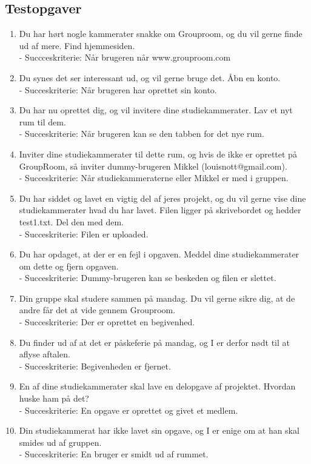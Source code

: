 \documentclass[12pt]{article}
\begin{document}
\subsection{Testopgaver}
\begin{enumerate}
\item Du har hørt nogle kammerater snakke om Grouproom, og du vil gerne finde ud af mere. Find hjemmesiden.\\
- Succceskriterie: Når brugeren når www.grouproom.com
\item Du synes det ser interessant ud, og vil gerne bruge det. Åbn en konto.\\
- Succeskriterie: Når brugeren har oprettet sin konto.
\item Du har nu oprettet dig, og vil invitere dine studiekammerater. Lav et nyt rum til dem.\\
- Succeskriterie: Når brugeren kan se den tabben for det nye rum.
\item Inviter dine studiekammerater til dette rum, og hvis de ikke er oprettet på GroupRoom, så inviter dummy-brugeren Mikkel (louisnott@gmail.com).\\
- Succeskriterie: Når studiekammeraterne eller Mikkel er med i gruppen.
\item Du har siddet og lavet en vigtig del af jeres projekt, og du vil gerne vise dine studiekammerater hvad du har lavet. Filen ligger på skrivebordet og hedder test1.txt. Del den med dem.\\
- Succeskriterie: Filen er uploaded.
\item Du har opdaget, at der er en fejl i opgaven. Meddel dine studiekammerater om dette og fjern opgaven.\\
- Succeskriterie: Dummy-brugeren kan se beskeden og filen er slettet.
\item Din gruppe skal studere sammen på mandag. Du vil gerne sikre dig, at de andre får det at vide gennem Grouproom.\\
- Succeskriterie: Der er oprettet en begivenhed.
\item Du finder ud af at det er påskeferie på mandag, og I er derfor nødt til at aflyse aftalen.\\
- Succeskriterie: Begivenheden er fjernet.
\item En af dine studiekammerater skal lave en delopgave af projektet. Hvordan huske ham på det?\\
- Succeskriterie: En opgave er oprettet og givet et medlem.
\item Din studiekammerat har ikke lavet sin opgave, og I er enige om at han skal smides ud af gruppen.\\
- Succeskriterie: En bruger er smidt ud af rummet.
\end{enumerate}
\end{document}

